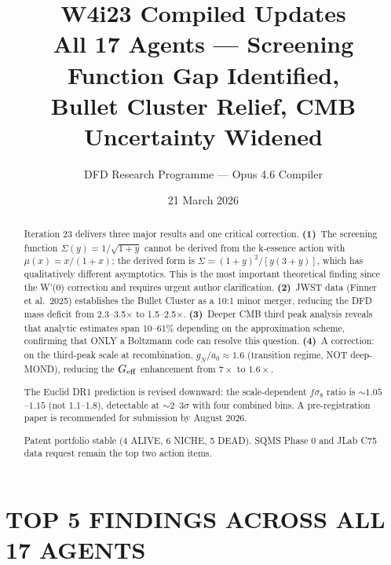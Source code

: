 \documentclass[11pt]{article}
\title{W4i23 Compiled Updates\\
\large All 17 Agents --- Screening Function Gap Identified,\\
Bullet Cluster Relief, CMB Uncertainty Widened}
\author{DFD Research Programme --- Opus 4.6 Compiler}
\date{21 March 2026}
\newcommand{\Geff}{G_{\rm eff}}
\newcommand{\aM}{a_0}
\begin{document}
\maketitle

\begin{abstract}
Iteration 23 delivers three major results and one critical correction.
\textbf{(1)}~The screening function $\Sigma(y) = 1/\sqrt{1+y}$ cannot
be derived from the k-essence action with $\mu(x) = x/(1+x)$; the
derived form is $\Sigma = (1+y)^2/[y(3+y)]$, which has qualitatively
different asymptotics.  This is the most important theoretical finding
since the W'(0) correction and requires urgent author clarification.
\textbf{(2)}~JWST data (Finner et al.\ 2025) establishes the Bullet
Cluster as a 10:1 minor merger, reducing the DFD mass deficit from
2.3--3.5$\times$ to 1.5--2.5$\times$.
\textbf{(3)}~Deeper CMB third peak analysis reveals that analytic
estimates span 10--61\% depending on the approximation scheme,
confirming that ONLY a Boltzmann code can resolve this question.
\textbf{(4)}~A correction: on the third-peak scale at recombination,
$g_N/\aM \approx 1.6$ (transition regime, NOT deep-MOND), reducing
the $\Geff$ enhancement from $7\times$ to $1.6\times$.

The Euclid DR1 prediction is revised downward: the scale-dependent
$f\sigma_8$ ratio is $\sim 1.05$--$1.15$ (not 1.1--1.8), detectable
at $\sim 2$--$3\sigma$ with four combined bins.  A pre-registration
paper is recommended for submission by August 2026.

Patent portfolio stable (4 ALIVE, 6 NICHE, 5 DEAD).  SQMS Phase 0
and JLab C75 data request remain the top two action items.
\end{abstract}

\tableofcontents
\newpage

\section{TOP 5 FINDINGS ACROSS ALL 17 AGENTS}
\end{document}

